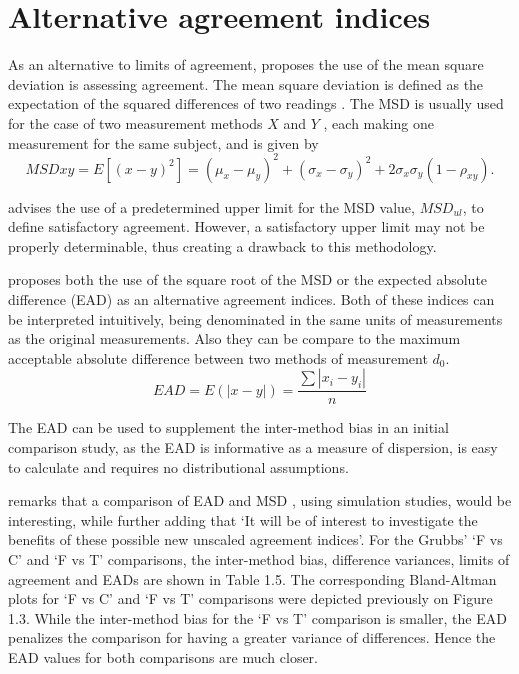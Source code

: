 \documentclass[12pt, a4paper]{report}
\theoremstyle{plain}
\theoremstyle{definition}
\theoremstyle{remark}
\begin{document}
	\section{Alternative agreement indices}
	As an alternative to limits of agreement, \citet{lin2002} proposes the use of
	the mean square deviation is assessing agreement. The mean square
	deviation is defined as the expectation of the squared differences
	of two readings . The MSD is usually used for the case of two
	measurement methods $X$ and $Y$ , each making one measurement for
	the same subject, and is given by
	\[
	MSDxy = E[(x - y)^2]  = (\mu_{x} - \mu_{y})^2 + (\sigma_{x} -
	\sigma_{y})^2 + 2\sigma_{x}\sigma_{y}(1-\rho_{xy}).
	\]
	
	
	\citet{Barnhart} advises the use of a predetermined upper limit
	for the MSD value, $MSD_{ul}$, to define satisfactory agreement.
	However, a satisfactory upper limit may not be properly
	determinable, thus creating a drawback to this methodology.
	
	\citet{Barnhart} proposes both the use of the square root of the
	MSD or the expected absolute difference (EAD) as an alternative agreement indices. Both of these indices can be interpreted intuitively, being denominated in the same units of measurements as the original
	measurements. Also they can be compare to the maximum acceptable
	absolute difference between two methods of measurement $d_{0}$.
	\[
	EAD = E(|x - y|) = \frac{\sum |x_{i}- y_{i}|}{n}
	\]
	
	The EAD can be used to supplement the inter-method bias in an
	initial comparison study, as the EAD is informative as a measure
	of dispersion, is easy to calculate and requires no distributional
	assumptions.
	
	
	\citet{Barnhart} remarks that a comparison of EAD and MSD , using
	simulation studies, would be interesting, while further adding
	that `It will be of interest to investigate the benefits of these
	possible new unscaled agreement indices'. For the Grubbs' `F vs C' and `F vs T' comparisons, the inter-method bias, difference variances, limits of agreement and EADs are shown
	in Table 1.5. The corresponding Bland-Altman plots for `F vs C' and `F vs T' comparisons were depicted previously on Figure 1.3. While the inter-method bias for the `F vs T' comparison is smaller, the EAD penalizes the comparison for having a greater variance of differences. Hence the EAD values for both comparisons are much closer.
	
\end{document}
